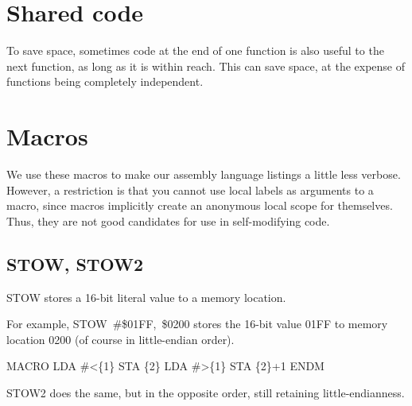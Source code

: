 \documentclass[10pt]{report}
\begin{document}
\section{Shared code}

To save space, sometimes code at the end of one function is also useful to
the next function, as long as it is within reach. This can save space, at
the expense of functions being completely independent.

\section{Macros}

We use these macros to make our assembly language listings a little less verbose.
However, a restriction is that you cannot use local labels as arguments to a macro,
since macros implicitly create an anonymous local scope for themselves. Thus, they are
not good candidates for use in self-modifying code.

\subsection{STOW, STOW2}

{\Tt{}STOW\nwendquote} stores a 16-bit literal value to a memory location.

For example, {\Tt{}STOW\ {\#}{\$}01FF,\ {\$}0200\nwendquote} stores the 16-bit value {\Tt{}{\#}{\$}01FF\nwendquote} to memory location {\Tt{}{\$}0200\nwendquote} (of course in little-endian order).

\nwenddocs{}\endmoddef\nwstartdeflinemarkup{}\nwenddeflinemarkup
    MACRO 
        LDA      #<\{1\}
        STA      \{2\}
        LDA      #>\{1\}
        STA      \{2\}+1
    ENDM
\eatline
{}\nwendcode{}\nwdocspar

{\Tt{}STOW2\nwendquote} does the same, but in the opposite order, still retaining little-endianness.
\end{document}
